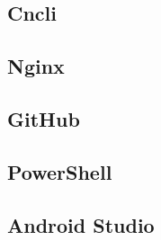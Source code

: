 \subsection*{Cncli}

\subsection*{Nginx}

\subsection*{GitHub}

\subsection*{PowerShell}

\subsection*{Android Studio}
